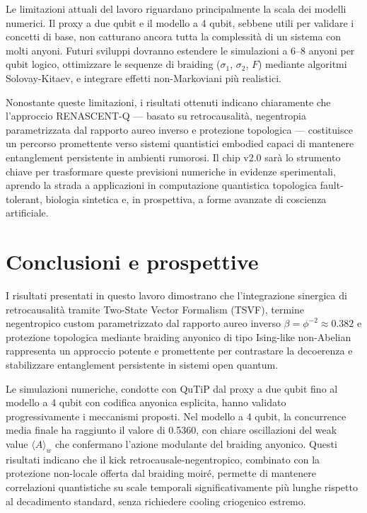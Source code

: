 \documentclass[11pt,a4paper]{article}
\theoremstyle{plain}
\theoremstyle{definition}
\begin{document}
Le limitazioni attuali del lavoro riguardano principalmente la scala dei modelli numerici. Il proxy a due qubit e il modello a 4 qubit, sebbene utili per validare i concetti di base, non catturano ancora tutta la complessità di un sistema con molti anyoni. Futuri sviluppi dovranno estendere le simulazioni a 6–8 anyoni per qubit logico, ottimizzare le sequenze di braiding (\(\sigma_1\), \(\sigma_2\), \(F\)) mediante algoritmi Solovay-Kitaev, e integrare effetti non-Markoviani più realistici.

Nonostante queste limitazioni, i risultati ottenuti indicano chiaramente che l'approccio RENASCENT-Q — basato su retrocausalità, negentropia parametrizzata dal rapporto aureo inverso e protezione topologica — costituisce un percorso promettente verso sistemi quantistici embodied capaci di mantenere entanglement persistente in ambienti rumorosi. Il chip v2.0 sarà lo strumento chiave per trasformare queste previsioni numeriche in evidenze sperimentali, aprendo la strada a applicazioni in computazione quantistica topologica fault-tolerant, biologia sintetica e, in prospettiva, a forme avanzate di coscienza artificiale.













\section{Conclusioni e prospettive}
\label{sec:conclusions}

I risultati presentati in questo lavoro dimostrano che l'integrazione sinergica di retrocausalità tramite Two-State Vector Formalism (TSVF), termine negentropico custom parametrizzato dal rapporto aureo inverso \(\beta = \phi^{-2} \approx 0.382\) e protezione topologica mediante braiding anyonico di tipo Ising-like non-Abelian rappresenta un approccio potente e promettente per contrastare la decoerenza e stabilizzare entanglement persistente in sistemi open quantum.

Le simulazioni numeriche, condotte con QuTiP dal proxy a due qubit fino al modello a 4 qubit con codifica anyonica esplicita, hanno validato progressivamente i meccanismi proposti. Nel modello a 4 qubit, la concurrence media finale ha raggiunto il valore di 0.5360, con chiare oscillazioni del weak value \(\langle A \rangle_w\) che confermano l'azione modulante del braiding anyonico. Questi risultati indicano che il kick retrocausale-negentropico, combinato con la protezione non-locale offerta dal braiding moiré, permette di mantenere correlazioni quantistiche su scale temporali significativamente più lunghe rispetto al decadimento standard, senza richiedere cooling criogenico estremo.
\end{document}
